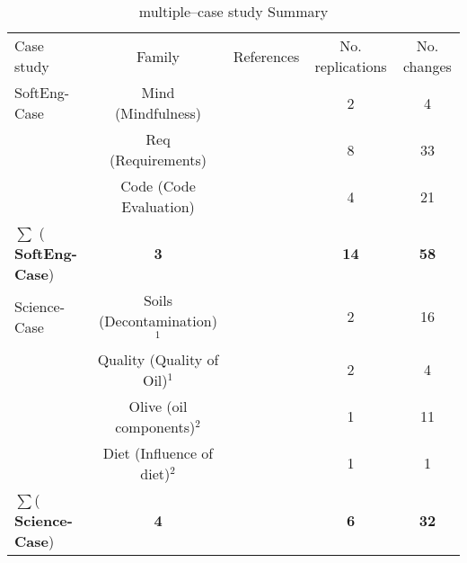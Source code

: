 \begin{table*}[h]
    \caption{multiple--case study Summary}
    \label{tab:compara-Case}
    \centering
    \footnotesize
    \begin{tabularx}{\textwidth}{
        >{\hsize=0.4\hsize}X
        cccc}

	 \toprule
  
	Case study & Family & References 
	& No. replications & No. changes \\


     
	\noalign{\smallskip}\hline\noalign{\smallskip}
	
 	SoftEng-Case 
 		& Mind (Mindfulness)&	
 		\cite{bernardez2014controlled,bernardez-jss-2016} 
 		& 2 & 4 \\
 		
 		& Req  (Requirements) &		
 		\cite{aranda2016estudio} 
 		& 8 & 33 \\

 		& Code (Code Evaluation) & 		\cite{juristo2003functional,juristo2012comparing,juristo2013process}
 		& 4 & 21 \\
 		
  	 	\hline
    	$\sum$ ( \textbf{SoftEng-Case}) & \textbf{3} & & \textbf{14} & \textbf{58}   \\
    	\hline
    
    Science-Case
 		& Soils (Decontamination)$^1$&	
 		\cite{madrid2016fitoextraccion,carvajal2016efecto} 
 		& 2 & 16 \\
 		
 		& Quality (Quality of Oil)$^1$&	
 		
 		& 2 & 4 \\
 		
 		& Olive  (oil components)$^2$ &		
 		\cite{garcia2016extraction}
 		& 1 & 11 \\

 		& Diet (Influence of diet)$^2$ & 					
 		\cite{pacheco2008meal} 		
 		& 1 & 1 \\
 	
	 	\hline
    	$\sum$( \textbf{Science-Case}) & \textbf{4} & &  \textbf{6} &  \textbf{32}  \\
    	\hline
    	

\end{tabularx}
\end{table*}
